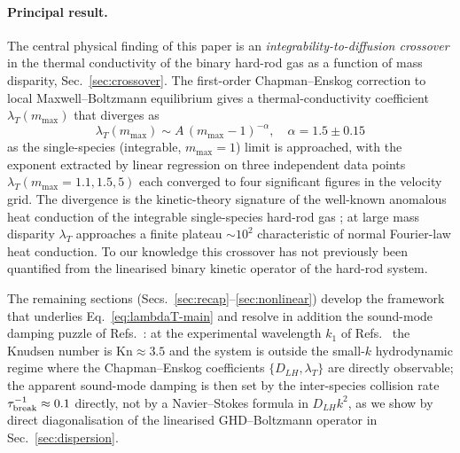 \documentclass[aps,pre,twocolumn,superscriptaddress,longbibliography,floatfix]{revtex4-2}
\begin{document}
\paragraph*{Principal result.}
The central physical finding of this paper is an
\emph{integrability-to-diffusion crossover} in the thermal
conductivity of the binary hard-rod gas as a function of
mass disparity, Sec.~\ref{sec:crossover}. The first-order
Chapman--Enskog correction to local Maxwell--Boltzmann
equilibrium gives a thermal-conductivity coefficient
$\lambda_T(m_{\max})$ that diverges as
\begin{equation}
\lambda_T(m_{\max}) \sim A\,(m_{\max}-1)^{-\alpha},
\quad \alpha = 1.5\pm 0.15
\label{eq:lambdaT-main}
\end{equation}
as the single-species (integrable, $m_{\max}=1$) limit is
approached, with the exponent extracted by linear
regression on three independent data points
$\lambda_T(m_{\max}=1.1,1.5,5)$ each converged to four
significant figures in the velocity grid. The divergence
is the kinetic-theory signature of the well-known anomalous
heat conduction of the integrable single-species hard-rod
gas \cite{HarrisHurst,Jepsen1965}; at large mass disparity
$\lambda_T$ approaches a finite plateau $\sim 10^2$
characteristic of normal Fourier-law heat conduction. To
our knowledge this crossover has not previously been
quantified from the linearised binary kinetic operator
of the hard-rod system.

The remaining sections (Secs.~\ref{sec:recap}--\ref{sec:nonlinear})
develop the framework that underlies
Eq.~\eqref{eq:lambdaT-main} and resolve in addition the
sound-mode damping puzzle of Refs.~\cite{PaperII,PaperIV}:
at the experimental wavelength $k_1$ of
Refs.~\cite{PaperII,PaperIII} the Knudsen number is
$\mathrm{Kn}\approx 3.5$ and the system is outside the
small-$k$ hydrodynamic regime where the
Chapman--Enskog coefficients
$\{D_{LH},\lambda_T\}$ are directly observable; the
apparent sound-mode damping is then set by the inter-species
collision rate $\tau_{\rm break}^{-1}\approx 0.1$ directly,
not by a Navier--Stokes formula in $D_{LH}k^2$, as we show
by direct diagonalisation of the linearised GHD--Boltzmann
operator in Sec.~\ref{sec:dispersion}.
\end{document}
